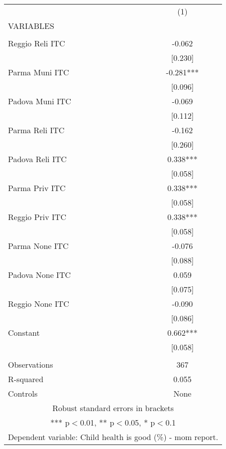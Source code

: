 \begin{tabular}{lc} \hline
 & (1) \\
VARIABLES &  \\ \hline
 &  \\
Reggio Reli ITC & -0.062 \\
 & [0.230] \\
Parma Muni ITC & -0.281*** \\
 & [0.096] \\
Padova Muni ITC & -0.069 \\
 & [0.112] \\
Parma Reli ITC & -0.162 \\
 & [0.260] \\
Padova Reli ITC & 0.338*** \\
 & [0.058] \\
Parma Priv ITC & 0.338*** \\
 & [0.058] \\
Reggio Priv ITC & 0.338*** \\
 & [0.058] \\
Parma None ITC & -0.076 \\
 & [0.088] \\
Padova None ITC & 0.059 \\
 & [0.075] \\
Reggio None ITC & -0.090 \\
 & [0.086] \\
Constant & 0.662*** \\
 & [0.058] \\
 &  \\
Observations & 367 \\
R-squared & 0.055 \\
 Controls & None \\ \hline
\multicolumn{2}{c}{ Robust standard errors in brackets} \\
\multicolumn{2}{c}{ *** p$<$0.01, ** p$<$0.05, * p$<$0.1} \\
\multicolumn{2}{c}{ Dependent variable: Child health is good (\%) - mom report.} \\
\end{tabular}

